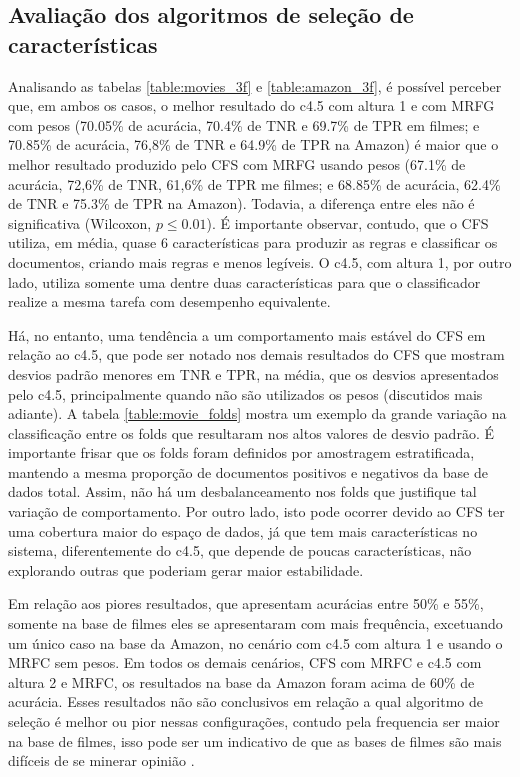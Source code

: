 \documentclass[template.tex]{subfiles}
\begin{document}
\subsection{Avaliação dos algoritmos de seleção de características}

Analisando as tabelas \ref{table:movies_3f} e \ref{table:amazon_3f}, é possível perceber que, em ambos os casos, o melhor resultado do c4.5 com altura 1 e com MRFG com pesos (70.05\% de acurácia, 70.4\% de TNR e 69.7\% de TPR em filmes; e 70.85\% de acurácia, 76,8\% de TNR e 64.9\% de TPR na Amazon) é maior que o melhor resultado produzido pelo CFS com MRFG usando pesos (67.1\% de acurácia, 72,6\% de TNR, 61,6\% de TPR me filmes; e 68.85\% de acurácia, 62.4\% de TNR e 75.3\% de TPR na Amazon). Todavia, a diferença entre eles não é significativa (Wilcoxon, $p\leq0.01$). É importante observar, contudo, que o CFS utiliza, em média, quase 6 características para produzir as regras e classificar os documentos, criando mais regras e menos legíveis. O c4.5, com altura 1, por outro lado, utiliza somente uma dentre duas características para que o classificador realize a mesma tarefa com desempenho equivalente. 
 
Há, no entanto, uma tendência a um comportamento mais estável do CFS em relação ao c4.5, que pode ser notado nos demais resultados do CFS que mostram desvios padrão menores em TNR e TPR,  na média, que os desvios apresentados pelo c4.5, principalmente quando não são utilizados os pesos (discutidos mais adiante). A tabela \ref{table:movie_folds} mostra um exemplo da grande variação na classificação entre os folds que resultaram nos altos valores de desvio padrão. É importante frisar que os folds foram definidos por amostragem estratificada, mantendo a mesma proporção de documentos positivos e negativos da base de dados total. Assim, não há um desbalanceamento nos folds que justifique tal variação de comportamento. Por outro lado, isto pode ocorrer devido ao CFS ter uma cobertura maior do espaço de dados, já que tem mais características no sistema, diferentemente do c4.5, que depende de poucas características, não explorando outras que poderiam gerar maior estabilidade.

Em relação aos piores resultados, que apresentam acurácias entre 50\% e 55\%, somente na base de filmes eles se apresentaram com mais frequência, excetuando um único caso na base da Amazon, no cenário com c4.5 com altura 1 e usando o MRFC sem pesos. Em todos os demais cenários, CFS com MRFC e c4.5 com altura 2 e MRFC, os resultados na base da Amazon foram acima de 60\% de acurácia. Esses resultados não são conclusivos em relação a qual algoritmo de seleção é melhor ou pior nessas configurações, contudo pela frequencia ser maior na base de filmes, isso pode ser um indicativo de que as bases de filmes são mais difíceis de se minerar opinião \cite{pang2002thumbs, chaovalit2005movie, whitelaw2005using}.
\end{document}
